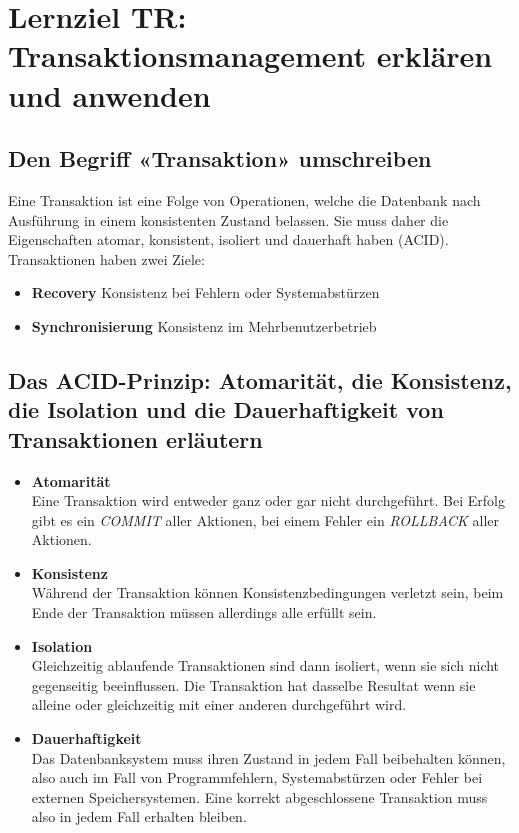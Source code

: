 \section{Lernziel TR: Transaktionsmanagement erklären und anwenden}

\subsection{Den Begriff «Transaktion» umschreiben}
Eine Transaktion ist eine Folge von Operationen, welche die Datenbank nach Ausführung in einem konsistenten Zustand belassen.
Sie muss daher die Eigenschaften atomar, konsistent, isoliert und dauerhaft haben (ACID).
Transaktionen haben zwei Ziele:

\begin{itemize}
  \item \textbf{Recovery}
  Konsistenz bei Fehlern oder Systemabstürzen
  \item \textbf{Synchronisierung}
  Konsistenz im Mehrbenutzerbetrieb
\end{itemize}

\subsection{Das ACID-Prinzip: Atomarität, die Konsistenz, die Isolation und die Dauerhaftigkeit von Transaktionen erläutern}
\begin{itemize}
  \item \textbf{Atomarität} \\
  Eine Transaktion wird entweder ganz oder gar nicht durchgeführt. Bei Erfolg gibt es ein \emph{COMMIT} aller Aktionen, bei einem Fehler ein \emph{ROLLBACK} aller Aktionen.
  \item \textbf{Konsistenz} \\
  Während der Transaktion können Konsistenzbedingungen verletzt sein, beim Ende der Transaktion müssen allerdings alle erfüllt sein.
  \item \textbf{Isolation} \\
  Gleichzeitig ablaufende Transaktionen sind dann isoliert, wenn sie sich nicht gegenseitig beeinflussen. Die Transaktion hat dasselbe Resultat wenn sie alleine oder gleichzeitig mit einer anderen durchgeführt wird.
  \item \textbf{Dauerhaftigkeit} \\
  Das Datenbanksystem muss ihren Zustand in jedem Fall beibehalten können, also auch im Fall von Programmfehlern, Systemabstürzen oder Fehler bei externen Speichersystemen. Eine korrekt abgeschlossene Transaktion muss also in jedem Fall erhalten bleiben.
\end{itemize}

